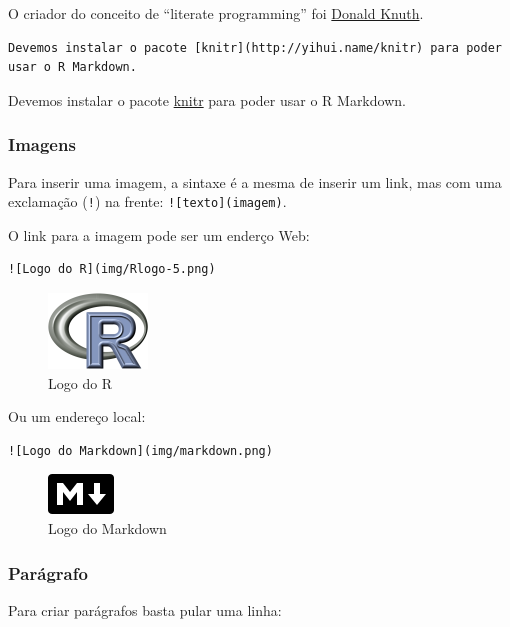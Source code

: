 \documentclass[10pt,a4paper]{book}
\begin{document}
O criador do conceito de ``literate programming'' foi
\href{https://en.wikipedia.org/wiki/Donald_Knuth}{Donald Knuth}.

\begin{verbatim}
Devemos instalar o pacote [knitr](http://yihui.name/knitr) para poder
usar o R Markdown.
\end{verbatim}

Devemos instalar o pacote \href{http://yihui.name/knitr}{knitr} para
poder usar o R Markdown.

\subsubsection*{Imagens}\label{imagens}


Para inserir uma imagem, a sintaxe é a mesma de inserir um link, mas com
uma exclamação (\texttt{!}) na frente: \texttt{!{[}texto{]}(imagem)}.

O link para a imagem pode ser um enderço Web:

\begin{verbatim}
![Logo do R](img/Rlogo-5.png)
\end{verbatim}

\begin{figure}
\centering
\includegraphics{img/Rlogo-5.png}
\caption{Logo do R}
\end{figure}

Ou um endereço local:

\begin{verbatim}
![Logo do Markdown](img/markdown.png)
\end{verbatim}

\begin{figure}
\centering
\includegraphics{img/markdown.png}
\caption{Logo do Markdown}
\end{figure}

\subsubsection*{Parágrafo}\label{paruxe1grafo}


Para criar parágrafos basta pular uma linha:
\end{document}
